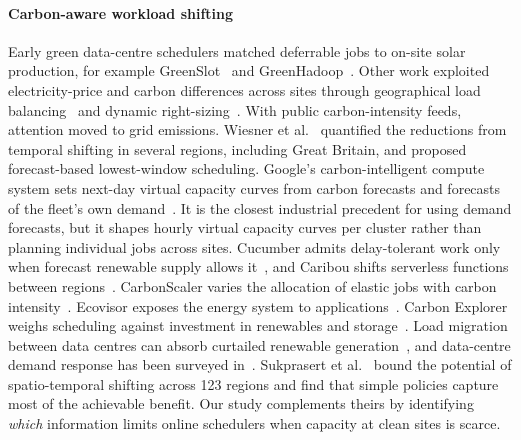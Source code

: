 \paragraph{Carbon-aware workload shifting} Early green data-centre schedulers matched deferrable jobs to on-site solar production, for example GreenSlot~\cite{goiri2011greenslot} and GreenHadoop~\cite{goiri2012greenhadoop}. Other work exploited electricity-price and carbon differences across sites through geographical load balancing~\cite{rao2010minimizing,liu2011greening} and dynamic right-sizing~\cite{lin2013dynamic}. With public carbon-intensity feeds, attention moved to grid emissions. Wiesner et al.~\cite{wiesner2021lets} quantified the reductions from temporal shifting in several regions, including Great Britain, and proposed forecast-based lowest-window scheduling. Google's carbon-intelligent compute system sets next-day virtual capacity curves from carbon forecasts and forecasts of the fleet's own demand~\cite{radovanovic2023carbon}. It is the closest industrial precedent for using demand forecasts, but it shapes hourly virtual capacity curves per cluster rather than planning individual jobs across sites. Cucumber admits delay-tolerant work only when forecast renewable supply allows it~\cite{wiesner2022cucumber}, and Caribou shifts serverless functions between regions~\cite{gsteiger2024caribou}. CarbonScaler varies the allocation of elastic jobs with carbon intensity~\cite{hanafy2023carbonscaler}. Ecovisor exposes the energy system to applications~\cite{souza2023ecovisor}. Carbon Explorer weighs scheduling against investment in renewables and storage~\cite{acun2023carbon}. Load migration between data centres can absorb curtailed renewable generation~\cite{zheng2020mitigating}, and data-centre demand response has been surveyed in~\cite{wierman2014opportunities}. Sukprasert et al.~\cite{sukprasert2024limitations} bound the potential of spatio-temporal shifting across 123 regions and find that simple policies capture most of the achievable benefit. Our study complements theirs by identifying \emph{which} information limits online schedulers when capacity at clean sites is scarce.

